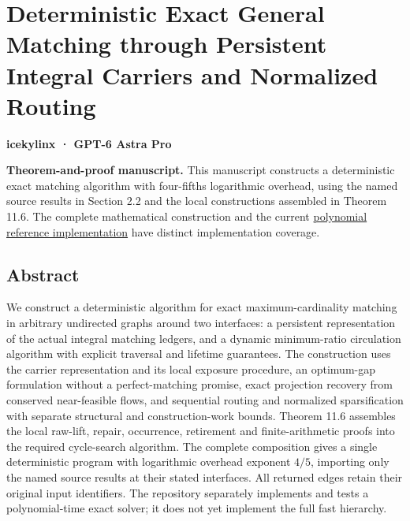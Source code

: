 
\hypertarget{af-46593eb93e-deterministic-exact-general-matching-through-persistent-integral-carriers-and-normalized-routing}{%
\section{Deterministic Exact General Matching through Persistent Integral Carriers and Normalized Routing}\label{af-46593eb93e-deterministic-exact-general-matching-through-persistent-integral-carriers-and-normalized-routing}}

\textbf{icekylinx · GPT-6 Astra Pro}

\textbf{Theorem-and-proof manuscript.} This manuscript constructs a deterministic exact matching algorithm with four-fifths logarithmic overhead, using the named source results in Section 2.2 and the local constructions assembled in Theorem 11.6. The complete mathematical construction and the current \href{https://github.com/icekylinx/algorithm-frontier/blob/main/problems/general-matching/reference/README.md}{polynomial reference implementation} have distinct implementation coverage.

\hypertarget{af-46593eb93e-abstract}{%
\subsection{Abstract}\label{af-46593eb93e-abstract}}

We construct a deterministic algorithm for exact maximum-cardinality matching in arbitrary undirected graphs around two interfaces: a persistent representation of the actual integral matching ledgers, and a dynamic minimum-ratio circulation algorithm with explicit traversal and lifetime guarantees. The construction uses the carrier representation and its local exposure procedure, an optimum-gap formulation without a perfect-matching promise, exact projection recovery from conserved near-feasible flows, and sequential routing and normalized sparsification with separate structural and construction-work bounds. Theorem 11.6 assembles the local raw-lift, repair, occurrence, retirement and finite-arithmetic proofs into the required cycle-search algorithm. The complete composition gives a single deterministic program with logarithmic overhead exponent \(4/5\), importing only the named source results at their stated interfaces. All returned edges retain their original input identifiers. The repository separately implements and tests a polynomial-time exact solver; it does not yet implement the full fast hierarchy.

